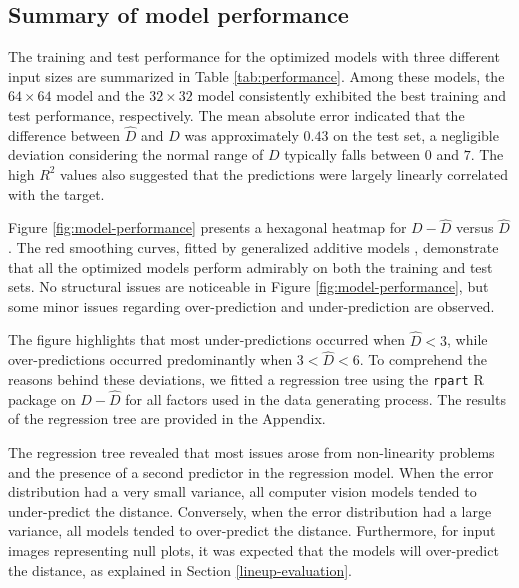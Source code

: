 \documentclass[]{interact}
\theoremstyle{plain}%
\theoremstyle{definition}
\theoremstyle{remark}
\begin{document}
\subsection{Summary of model
performance}\label{summary-of-model-performance}

The training and test performance for the optimized models with three
different input sizes are summarized in Table \ref{tab:performance}.
Among these models, the \(64 \times 64\) model and the \(32 \times 32\)
model consistently exhibited the best training and test performance,
respectively. The mean absolute error indicated that the difference
between \(\hat{D}\) and \(D\) was approximately \(0.43\) on the test
set, a negligible deviation considering the normal range of \(D\)
typically falls between \(0\) and \(7\). The high \(R^2\) values also
suggested that the predictions were largely linearly correlated with the
target.

Figure \ref{fig:model-performance} presents a hexagonal heatmap for
\(D - \hat{D}\) versus \(\hat{D}\). The red smoothing curves, fitted by
generalized additive models \citep{hastie2017generalized}, demonstrate
that all the optimized models perform admirably on both the training and
test sets. No structural issues are noticeable in Figure
\ref{fig:model-performance}, but some minor issues regarding
over-prediction and under-prediction are observed.

The figure highlights that most under-predictions occurred when
\(\hat{D} < 3\), while over-predictions occurred predominantly when
\(3 < \hat{D} < 6\). To comprehend the reasons behind these deviations,
we fitted a regression tree using the \texttt{rpart} R package
\citep{Terry2022rpart} on \(D - \hat{D}\) for all factors used in the
data generating process. The results of the regression tree are provided
in the Appendix.

The regression tree revealed that most issues arose from non-linearity
problems and the presence of a second predictor in the regression model.
When the error distribution had a very small variance, all computer
vision models tended to under-predict the distance. Conversely, when the
error distribution had a large variance, all models tended to
over-predict the distance. Furthermore, for input images representing
null plots, it was expected that the models will over-predict the
distance, as explained in Section \ref{lineup-evaluation}.
\end{document}
